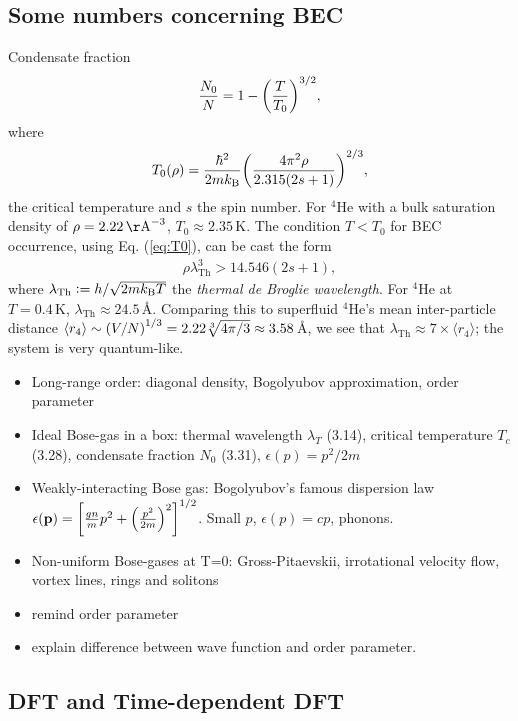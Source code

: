 \documentclass[11pt,a4paper,twoside]{article}
\renewcommand{\vec}[1]{\bm{\mathrm{#1}}}
\begin{document}
		\subsection{Some numbers concerning BEC}
			Condensate fraction
			\begin{align}
				\frac{N_0}{N} = 1-\qty(\frac{T}{T_0})^{3/2},
			\end{align}
			where
			\begin{align}
				T_0(\rho) = \frac{\hbar^2}{2mk_\mathrm{B}}\qty(\frac{4\pi^2\rho}{2.315(2s+1)})^{2/3},\label{eq:T0}
			\end{align}
			the critical temperature and $s$ the spin number. For $^4$He with a bulk saturation density of $\rho=2.22\,\mathrm\AA^{-3}$, $T_0\approx 2.35\,\mathrm{K}$. The condition $T<T_0$ for BEC occurrence, using Eq. (\ref{eq:T0}), can be cast the form
			\begin{align}
				\rho\lambda_{\mathrm{Th}}^3>14.546(2s+1),
			\end{align}
			where $\lambda_{\mathrm{Th}} \vcentcolon= h/\sqrt{2mk_\mathrm{B}T}$ the \emph{thermal de Broglie wavelength}. For $^4$He at $T=0.4\,\mathrm{K}$, $\lambda_{\mathrm{Th}}\approx 24.5$\,\AA. Comparing this to superfluid $^4$He's mean inter-particle distance $\langle r_4 \rangle \sim \qty(V/N)^{1/3}=2.22\sqrt[3]{4\pi/3}\approx 3.58$\,\AA, we see that $\lambda_{\mathrm{Th}}\approx 7\times\langle r_4 \rangle $; the system is very quantum-like.

			\begin{itemize}
				\item Long-range order: diagonal density, Bogolyubov approximation, order parameter
				\item Ideal Bose-gas in a box: thermal wavelength $\lambda_T$ (3.14), critical temperature $T_c$ (3.28), condensate fraction $N_0$ (3.31), $\epsilon(p)=p^2/2m$
				\item Weakly-interacting Bose gas: Bogolyubov's famous dispersion law $\epsilon(\vec{p})=\qty[\frac{gn}{m}p^2+\qty(\frac{p^2}{2m})^2]^{1/2}$. Small $p$, $\epsilon(p)=cp$, phonons.
				\item Non-uniform Bose-gases at T=0: Gross-Pitaevskii, irrotational velocity flow, vortex lines, rings and solitons
				\item remind order parameter
				\item explain difference between wave function and order parameter.
			\end{itemize}
			
		\subsection{DFT and Time-dependent DFT}
		
\end{document}
